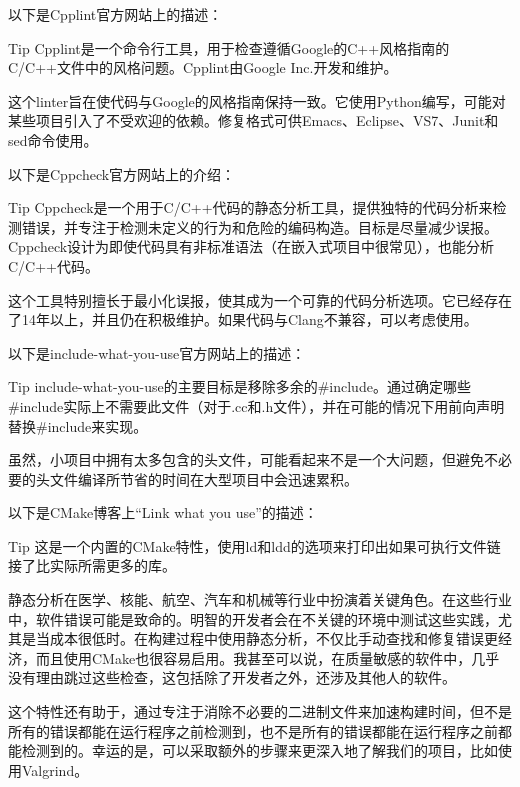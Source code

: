 
以下是Cpplint官方网站上的描述：

\begin{myTip}{Tip}
Cpplint是一个命令行工具，用于检查遵循Google的C++风格指南的C/C++文件中的风格问题。Cpplint由Google Inc.开发和维护。
\end{myTip}

这个linter旨在使代码与Google的风格指南保持一致。它使用Python编写，可能对某些项目引入了不受欢迎的依赖。修复格式可供Emacs、Eclipse、VS7、Junit和sed命令使用。


以下是Cppcheck官方网站上的介绍：

\begin{myTip}{Tip}
Cppcheck是一个用于C/C++代码的静态分析工具，提供独特的代码分析来检测错误，并专注于检测未定义的行为和危险的编码构造。目标是尽量减少误报。Cppcheck设计为即使代码具有非标准语法（在嵌入式项目中很常见），也能分析C/C++代码。
\end{myTip}

这个工具特别擅长于最小化误报，使其成为一个可靠的代码分析选项。它已经存在了14年以上，并且仍在积极维护。如果代码与Clang不兼容，可以考虑使用。


以下是include-what-you-use官方网站上的描述：

\begin{myTip}{Tip}
include-what-you-use的主要目标是移除多余的\#include。通过确定哪些\#include实际上不需要此文件（对于.cc和.h文件），并在可能的情况下用前向声明替换\#include来实现。
\end{myTip}

虽然，小项目中拥有太多包含的头文件，可能看起来不是一个大问题，但避免不必要的头文件编译所节省的时间在大型项目中会迅速累积。


以下是CMake博客上“Link what you use”的描述：

\begin{myTip}{Tip}
这是一个内置的CMake特性，使用ld和ldd的选项来打印出如果可执行文件链接了比实际所需更多的库。
\end{myTip}

静态分析在医学、核能、航空、汽车和机械等行业中扮演着关键角色。在这些行业中，软件错误可能是致命的。明智的开发者会在不关键的环境中测试这些实践，尤其是当成本很低时。在构建过程中使用静态分析，不仅比手动查找和修复错误更经济，而且使用CMake也很容易启用。我甚至可以说，在质量敏感的软件中，几乎没有理由跳过这些检查，这包括除了开发者之外，还涉及其他人的软件。

这个特性还有助于，通过专注于消除不必要的二进制文件来加速构建时间，但不是所有的错误都能在运行程序之前检测到，也不是所有的错误都能在运行程序之前都能检测到的。幸运的是，可以采取额外的步骤来更深入地了解我们的项目，比如使用Valgrind。









